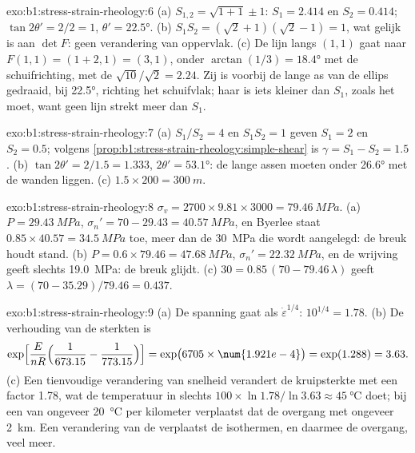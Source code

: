 \begin{solution}{exo:b1:stress-strain-rheology:6}
(a) $S_{1,2} = \sqrt{1 + 1} \pm 1$: $S_1 = 2.414$ en $S_2 = 0.414$;
$\tan2\theta' = 2/2 = 1$, $\theta' = \ang{22.5}$. (b) $S_1S_2 =
(\sqrt2 + 1)(\sqrt2 - 1) = 1$, wat gelijk is aan $\det F$: geen verandering van
oppervlak. (c) De lijn langs $(1, 1)$ gaat naar $F(1, 1) = (1 + 2, 1) = (3, 1)$,
onder $\arctan(1/3) = \ang{18.4}$ met de schuifrichting, met de 
$\sqrt{10}/\sqrt2 = 2.24$. Zij is voorbij de lange as van de ellips gedraaid,
bij \ang{22.5}, richting het schuifvlak; haar  is iets kleiner dan
$S_1$, zoals het moet, want geen lijn strekt meer dan $S_1$.
\end{solution}

\begin{solution}{exo:b1:stress-strain-rheology:7}
(a) $S_1/S_2 = 4$ en $S_1S_2 = 1$ geven $S_1 = 2$ en $S_2 = 0.5$; volgens
\cref{prop:b1:stress-strain-rheology:simple-shear} is $\gamma = S_1 - S_2 =
1.5$. (b) $\tan2\theta' = 2/1.5 = 1.333$, $2\theta' = \ang{53.1}$: de lange assen
moeten onder \ang{26.6} met de wanden liggen. (c) $1.5\times200 = \qty{300}{m}$.
\end{solution}

\begin{solution}{exo:b1:stress-strain-rheology:8}
$\sigma_v = 2700\times9.81\times3000 = \qty{79.46}{MPa}$. (a) $P = \qty{29.43}{MPa}$,
$\sigma_n' = 70 - 29.43 = \qty{40.57}{MPa}$, en Byerlee staat
$0.85\times40.57 = \qty{34.5}{MPa}$ toe, meer dan de \qty{30}{MPa} die wordt aangelegd: de
breuk houdt stand. (b) $P = 0.6\times79.46 = \qty{47.68}{MPa}$, $\sigma_n' =
\qty{22.32}{MPa}$, en de wrijving geeft slechts \qty{19.0}{MPa}: de breuk
glijdt. (c) $30 = 0.85\,(70 - 79.46\,\lambda)$ geeft $\lambda = (70 -
35.29)/79.46 = 0.437$.
\end{solution}

\begin{solution}{exo:b1:stress-strain-rheology:9}
(a) De spanning gaat als $\dot\varepsilon^{1/4}$: $10^{1/4} = 1.78$. (b) De
verhouding van de sterkten is
\[
  \exp\Bigl[\frac{E}{nR}\Bigl(\frac{1}{673.15} - \frac{1}{773.15}\Bigr)\Bigr]
  = \exp\bigl(6705\times\num{1.921e-4}\bigr) = \exp(1.288) = 3.63 .
\]
(c) Een tienvoudige verandering van snelheid verandert de kruipsterkte met een
factor 1.78, wat de temperatuur in slechts $100\times\ln1.78/\ln3.63 \approx
\qty{45}{\degreeCelsius}$ doet; bij een  van ongeveer \qty{20}{\degreeCelsius}
per kilometer verplaatst dat de overgang met ongeveer \qty{2}{km}. Een verandering
van de  verplaatst de isothermen, en daarmee de overgang, veel meer.
\end{solution}

